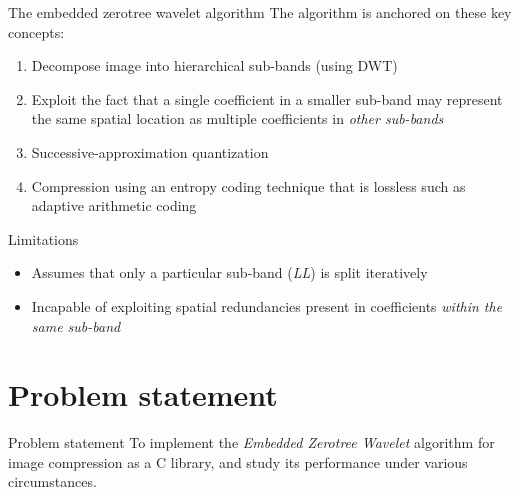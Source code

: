\documentclass{beamer}
\begin{document}
\begin{frame}{The embedded zerotree wavelet algorithm}
    The algorithm is anchored on these key concepts: \cite{shap1993, sayood_datac}
    \vspace{0.5cm}

    \begin{enumerate}
        \item Decompose image into hierarchical sub-bands (using DWT)
        \item Exploit the fact that a single coefficient in a smaller sub-band
            may represent the same spatial location as multiple coefficients in
            \textit{other sub-bands}
        \item Successive-approximation quantization
        \item Compression using an entropy coding technique that is lossless
            such as adaptive arithmetic coding
    \end{enumerate}
\end{frame}

\begin{frame}{Limitations}
    \begin{itemize}
        \item Assumes that only a particular sub-band (\textit{LL}) is split iteratively
        \item Incapable of exploiting spatial redundancies present in
            coefficients \textit{within the same sub-band}
    \end{itemize}
\end{frame}

\section{Problem statement}
\begin{frame}{Problem statement}
    To implement the \textit{Embedded Zerotree Wavelet} algorithm for image
    compression as a C library, and study its performance under various
    circumstances.
\end{frame}
\end{document}

